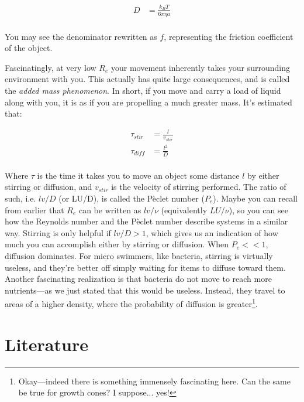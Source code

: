 \begin{equation} \label{diffdef}
\begin{split}
D &= \frac{k_BT}{6\pi\eta a} \\
\end{split}
\end{equation}

You may see the denominator rewritten as $f$, representing the friction coefficient of the object.\newline

Fascinatingly, at very low $R_e$ your movement inherently takes your surrounding environment with you. This actually has quite large consequences, and is called the \textit{added mass phenomenon}. In short, if you move and carry a load of liquid along with you, it is as if you are propelling a much greater mass. It's estimated that: 

\begin{equation} \label{diff01}
\begin{split}
\tau_{stir} &= \frac{l}{v_{stir}} \\
\tau_{diff} &= \frac{l^2}{D} \\
\end{split}
\end{equation}

Where $\tau$ is the time it takes you to move an object some distance $l$ by either stirring or diffusion, and $v_{stir}$ is the velocity of stirring performed. The ratio of such, i.e. $lv / D$ (or LU/D), is called the P\`eclet number ($P_e$). Maybe you can recall from earlier that $R_e$ can be written as $lv / \nu$ (equivalently $LU / \nu$), so you can see how the Reynolds number and the P\`eclet number describe systems in a similar way. Stirring is only helpful if $lv / D > 1$, which gives us an indication of how much you can accomplish either by stirring or diffusion. When $P_e << 1$, diffusion dominates. For micro swimmers, like bacteria, stirring is virtually useless, and they're better off simply waiting for items to diffuse toward them. Another fascinating realization is that bacteria do not move to reach more nutrients---as we just stated that this would be useless. Instead, they travel to areas of a higher density, where the probability of diffusion is greater\footnote{Okay---indeed there is something immensely fascinating here. Can the same be true for growth cones? I suppose... yes!}. 




\section{Literature}

